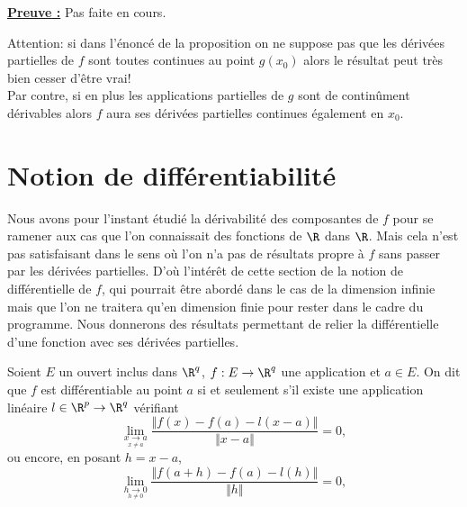 \documentclass[class=report,crop=false]{standalone}
\begin{document}
\noindent \underline{\bf Preuve :}
Pas faite en cours.



 \begin{remarque*}
\textcolor[rgb]{0.00,0.00,1.00}{
\noindent 
Attention: si dans l'énoncé de la proposition on ne suppose pas que les dérivées partielles de $f$ sont
toutes continues au point $g(x_0)$ alors le résultat peut très bien cesser d'être vrai!\\
Par contre, si en plus les applications partielles de $g$ sont de continûment dérivables alors $f$ aura ses dérivées partielles continues également en $x_0$.
}
\end{remarque*}

\section{Notion de différentiabilité }

\noindent Nous avons pour l'instant étudié la dérivabilité des composantes de $f$ pour se ramener aux cas que l'on connaissait
des fonctions de $\R$ dans $\R$. Mais cela n'est pas satisfaisant dans le sens où l'on n'a pas de résultats propre à $f$ sans passer par les dérivées partielles. D'où l'intérêt de cette section de la notion de différentielle de $f$, qui pourrait être abordé dans le cas de la dimension infinie mais que l'on ne traitera qu'en dimension finie pour rester dans le cadre du programme. Nous donnerons des résultats permettant
 de relier la différentielle d'une fonction avec ses dérivées partielles. 

\begin{definition}
\textcolor[rgb]{0.73,0.00,0.00}{
Soient $E$ un ouvert inclus dans $\R^q$,  $f: E \rightarrow \R^q$ une application et $a  \in E$.
On dit que $f$ est différentiable au point $a$ si et seulement s'il existe une application linéaire
$l \in \R^p \rightarrow \R^q$ vérifiant
\begin{equation*}
\displaystyle \lim_{\underset{x \neq a}{ x\rightarrow a}}  \dfrac{\Vert f(x)-f(a)-l(x-a)\Vert}{\Vert x-a \Vert}=0,
\end{equation*}
ou encore, en posant $h=x-a$,
\begin{equation*}
\displaystyle \lim_{\underset{h \neq 0}{h\rightarrow 0}}  \dfrac{\Vert f(a+h)-f(a)-l(h)\Vert}{\Vert h \Vert}=0,
\end{equation*}
}
 \end{definition}
\end{document}
